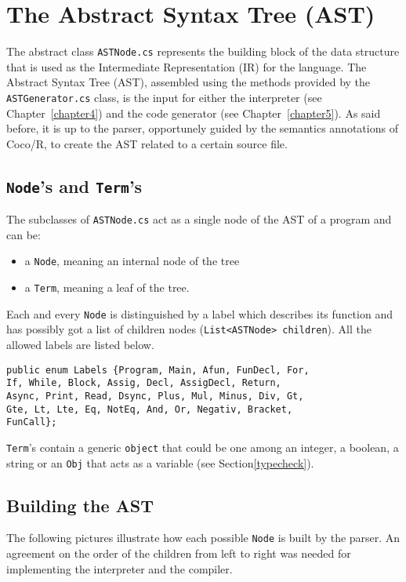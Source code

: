 \chapter{\label{chapter3} The Abstract Syntax Tree (AST)}

The abstract class \texttt{ASTNode.cs} represents the building block of the data structure that is used as the Intermediate Representation (IR) for the \fwap language. The Abstract Syntax Tree (AST), assembled using the methods provided by the \texttt{ASTGenerator.cs} class, is the input for either the interpreter (see Chapter~\ref{chapter4}) and the \fsharp code generator (see Chapter~\ref{chapter5}). As said before, it is up to the parser, opportunely guided by the semantics annotations of Coco/R, to create the AST related to a certain \fwap source file.

\section{\texttt{Node}'s and \texttt{Term}'s}

The subclasses of \texttt{ASTNode.cs} act as a single node of the AST of a program and can be:
\begin{itemize}
	\item a \texttt{Node}, meaning an internal node of the tree 
	\item a \texttt{Term}, meaning a leaf of the tree.
\end{itemize}

Each and every \texttt{Node} is distinguished by a label which describes its function and has possibly got a list of children nodes (\texttt{List<ASTNode> children}). All the allowed labels are listed below.\\

\begin{lstlisting}[caption=Labels for \texttt{Node}s.]
public enum Labels {Program, Main, Afun, FunDecl, For,
If, While, Block, Assig, Decl, AssigDecl, Return, 
Async, Print, Read, Dsync, Plus, Mul, Minus, Div, Gt,
Gte, Lt, Lte, Eq, NotEq, And, Or, Negativ, Bracket, 
FunCall};
\end{lstlisting}

\texttt{Term}'s contain a generic \texttt{object} that could be one among an integer, a boolean, a string or an \texttt{Obj} that acts as a variable (see Section\ref{typecheck}).

\section{Building the AST}

The following pictures illustrate how each possible \texttt{Node} is built by the parser. An agreement on the order of the children from left to right was needed for implementing the interpreter and the \fsharp compiler.